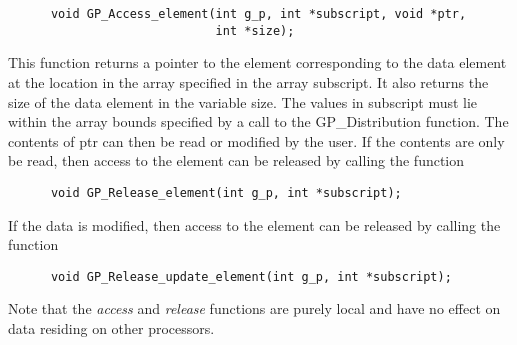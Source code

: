 \begin{verbatim}
      void GP_Access_element(int g_p, int *subscript, void *ptr,
                             int *size);
\end{verbatim}

\noindent
This function returns a pointer to the element corresponding to the data element
at the location in the array specified in the array subscript. It also returns
the size of the data element in the variable size. The values in subscript must
lie within the array bounds specified by a call to the GP\_Distribution
function. The contents of ptr can then be read or modified by the user. If the
contents are only be read, then access to the element can be released by calling
the function

\begin{verbatim}
      void GP_Release_element(int g_p, int *subscript);
\end{verbatim}

\noindent
If the data is modified, then access to the element can be released by calling
the function

\begin{verbatim}
      void GP_Release_update_element(int g_p, int *subscript);
\end{verbatim}

\noindent
Note that the \emph{access} and \emph{release} functions are purely local and
have no effect on data residing on other processors.
